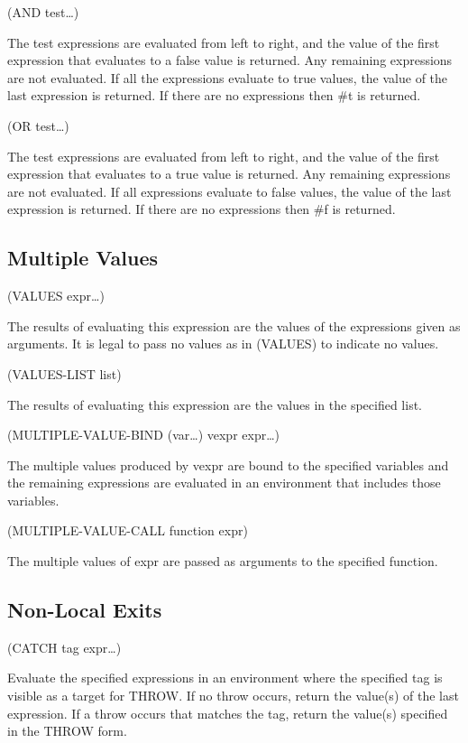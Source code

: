 \documentclass[11pt]{article}
\begin{document}
(AND test\ldots{})

The test expressions are evaluated from left to right, and the value of
the first expression that evaluates to a false value is returned. Any
remaining expressions are not evaluated. If all the expressions evaluate
to true values, the value of the last expression is returned. If there
are no expressions then \#t is returned.

(OR test\ldots{})

The test expressions are evaluated from left to right, and the value of
the first expression that evaluates to a true value is returned. Any
remaining expressions are not evaluated. If all expressions evaluate to
false values, the value of the last expression is returned. If there are
no expressions then \#f is returned.

\subsection{Multiple Values}
\label{sec-1-6}

(VALUES expr\ldots{})

The results of evaluating this expression are the values of the
expressions given as arguments.  It is legal to pass no values as in
(VALUES) to indicate no values.

(VALUES-LIST list)

The results of evaluating this expression are the values in the
specified list.

(MULTIPLE-VALUE-BIND (var\ldots{}) vexpr expr\ldots{})

The multiple values produced by vexpr are bound to the specified
variables and the remaining expressions are evaluated in an environment
that includes those variables.

(MULTIPLE-VALUE-CALL function expr)

The multiple values of expr are passed as arguments to the specified
function.
\subsection{Non-Local Exits}
\label{sec-1-7}

(CATCH tag expr\ldots{})

Evaluate the specified expressions in an environment where the specified
tag is visible as a target for THROW.  If no throw occurs, return the
value(s) of the last expression.  If a throw occurs that matches the
tag, return the value(s) specified in the THROW form.
\end{document}
